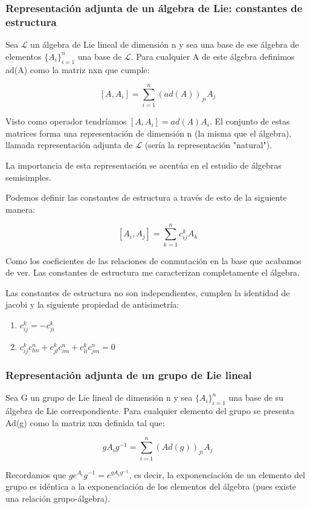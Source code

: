 \subsubsection{Representación adjunta de un álgebra de Lie: constantes de estructura}

Sea $\mathcal{L}$ un álgebra de Lie lineal de dimensión n y sea una base de ese álgebra de elementos $\lbrace A_i\rbrace _{i=1}^n$ una base de $\mathcal{L}$. Para cualquier A de este álgebra definimos ad(A) como la matriz nxn que cumple:

$$[A,A_i]=\sum _{i=1}^n (ad(A))_{ji}A_j$$

Visto como operador tendríamos $[A,A_i]=ad(A)A_i$. El conjunto de estas matrices forma una representación de dimensión n (la misma que el álgebra), llamada representación adjunta de $\mathcal{L}$ (sería la representación "natural").

La importancia de esta representación se acentúa en el estudio de álgebras semisimples.

\smallskip
Podemos definir las constantes de estructura a través de esto de la siguiente manera:

$$[A_i,A_j]=\sum _{k=1}^n c_{ij}^k A_k$$

Como los coeficientes de las relaciones de conmutación en la base que acabamos de ver. Las constantes de estructura me caracterizan completamente el álgebra.

Las constantes de estructura no son independientes, cumplen la identidad de jacobi y la siguiente propiedad de antisimetría:

\begin{enumerate}
\item $     c_{ij}^k=-c_{ji}^k $
\item $
c_{ij}^kc_{lm}^n + c^k_{jl}c_{im}^n+ c_{li}^kc^n_{jm}=0 $
\end{enumerate}


\subsubsection{Representación adjunta de un grupo de Lie lineal}

Sea G un grupo de Lie lineal de dimensión n y sea $\lbrace A_i \rbrace _{i=1}^n$ una base de su álgebra de Lie correspondiente. Para cualquier elemento del grupo se presenta Ad(g) como la matriz nxn definida tal que:

$$gA_ig^{-1}=\sum _{i=1}^n (Ad(g))_{ji} A_j$$

Recordamos que $ge^{A_i}g^{-1}=e^{gA_ig^{-1}}$, es decir, la exponenciación de un elemento del grupo es idéntica a la exponenciación de los elementos del álgebra (pues existe una relación grupo-álgebra).

